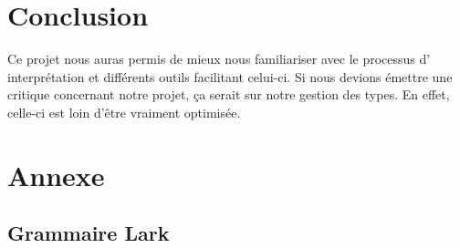 \documentclass[a4paper, 12pt]{article}
\begin{document}
\section{Conclusion}

Ce projet nous auras permis de mieux nous familiariser avec le processus d' interprétation et différents outils facilitant celui-ci. Si nous devions émettre une critique concernant notre projet, ça serait sur notre gestion des types. En effet, celle-ci est loin d'être vraiment optimisée.

\section{Annexe}

\subsection{Grammaire Lark}
\end{document}
